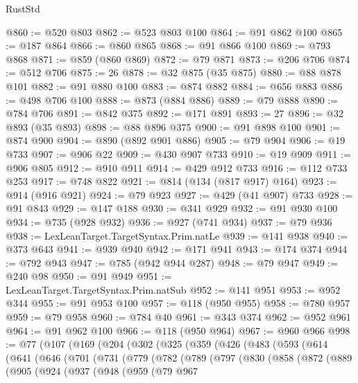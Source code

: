\begin{lexlean}{RustStd}
\begin{coremodule}
{\begin{coremodule}
{{{{{{{{{{{{{{{{{{{{{{{{{{{{{{{{@860 := @520 @803
@862 := @523 @803 @100
@864 := @91 @862 @100
@865 := @187 @864
@866 := @860 @865
@868 := @91 @866 @100
@869 := @793 @868
@871 := @859 (@860 @869)
@872 := @79 @871
@873 := @206 @706
@874 := @512 @706
@875 := 26
@878 := @32 @875 (@35 @875)
@880 := @88 @878 @101
@882 := @91 @880 @100
@883 := @874 @882
@884 := @656 @883
@886 := @498 @706 @100
@888 := @873 (@884 @886)
@889 := @79 @888
@890 := @784 @706
@891 := @842 @375
@892 := @171 @891
@893 := 27
@896 := @32 @893 (@35 @893)
@898 := @88 @896 @375
@900 := @91 @898 @100
@901 := @874 @900
@904 := @890 (@892 @901 @886)
@905 := @79 @904
@906 := @19 @733
@907 := @906 @22
@909 := @430 @907 @733
@910 := @19 @909
@911 := @906 @805
@912 := @910 @911
@914 := @429 @912 @733
@916 := @112 @733 @253
@917 := @748 @822
@921 := @814 (@134 (@817 @917) @164)
@923 := @914 (@916 @921)
@924 := @79 @923
@927 := @429 (@41 @907) @733
@928 := @91 @843
@929 := @147 @188
@930 := @341 @929
@932 := @91 @930 @100
@934 := @735 (@928 @932)
@936 := @927 (@741 @934)
@937 := @79 @936
@938 := LexLeanTarget.TargetSyntax.Prim.natLe
@939 := @141 @938
@940 := @373 @643
@941 := @939 @940
@942 := @171 @941
@943 := @174 @374
@944 := @792 @943
@947 := @785 (@942 @944 @287)
@948 := @79 @947
@949 := @240 @98
@950 := @91 @949
@951 := LexLeanTarget.TargetSyntax.Prim.natSub
@952 := @141 @951
@953 := @952 @344
@955 := @91 @953 @100
@957 := @118 (@950 @955)
@958 := @780 @957
@959 := @79 @958
@960 := @784 @40
@961 := @343 @374
@962 := @952 @961
@964 := @91 @962 @100
@966 := @118 (@950 @964)
@967 := @960 @966
@998 := @77
    (@107
      (@169
        (@204
          (@302
            (@325
              (@359
                (@426
                  (@483
                    (@593
                      (@614
                        (@641
                          (@646
                            (@701
                              (@731
                                (@779
                                  (@782
                                    (@789
                                      (@797
                                        (@830
                                          (@858
                                            (@872
                                              (@889
                                                (@905
                                                  (@924
                                                    (@937
                                                      (@948
                                                        (@959
                                                          (@79
                                                            @967
}}}}}}}}}}}}}}}}}}}}}}}}}}}}}}}}
\end{coremodule}}
\end{coremodule}
\end{lexlean}
